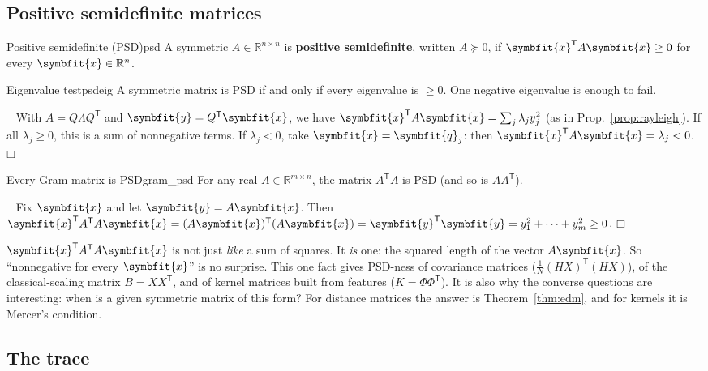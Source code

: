 \documentclass[11pt]{article}
\newcommand{\bm}[1]{\symbfit{#1}}
\newenvironment{proofsketch}{\par\noindent{\itshape Proof.}\ }{\hfill$\mdlgwhtsquare$\par}
\newcommand{\R}{\mathbb{R}}
\newcommand{\vx}{\bm{x}}
\newcommand{\vy}{\bm{y}}
\newcommand{\vq}{\bm{q}}
\newcommand{\T}{^{\mathsf T}}
\begin{document}
\subsection{Positive semidefinite matrices}

\begin{definition}{Positive semidefinite (PSD)}{psd}
A symmetric $A\in\R^{n\times n}$ is \textbf{positive semidefinite}, written $A\succeq0$, if
$\vx\T A\vx\ge0$ for every $\vx\in\R^n$.
\end{definition}

\begin{proposition}{Eigenvalue test}{psdeig}
A symmetric matrix is PSD if and only if every eigenvalue is $\ge0$. One negative eigenvalue is enough to fail.
\end{proposition}
\begin{proofsketch}
With $A=Q\Lambda Q\T$ and $\vy=Q\T\vx$, we have $\vx\T A\vx=\sum_j\lambda_jy_j^2$ (as in Prop.~\ref{prop:rayleigh}). If all
$\lambda_j\ge0$, this is a sum of nonnegative terms. If $\lambda_j<0$, take $\vx=\vq_j$: then $\vx\T A\vx=\lambda_j<0$.
\end{proofsketch}

\begin{proposition}{Every Gram matrix is PSD}{gram_psd}
For any real $A\in\R^{m\times n}$, the matrix $A\T A$ is PSD (and so is $AA\T$).
\end{proposition}
\begin{proofsketch}
Fix $\vx$ and let $\vy=A\vx$. Then $\vx\T A\T A\vx=(A\vx)\T(A\vx)=\vy\T\vy=y_1^2+\cdots+y_m^2\ge0$.
\end{proofsketch}

\begin{intuition}
$\vx\T A\T A\vx$ is not just \emph{like} a sum of squares. It \emph{is} one: the squared length of
the vector $A\vx$. So ``nonnegative for every $\vx$'' is no surprise. This one fact gives
PSD-ness of covariance matrices ($\tfrac1N(HX)\T(HX)$), of the classical-scaling matrix $B=XX\T$, and of
kernel matrices built from features ($K=\Phi\Phi\T$). It is also why the converse questions are
interesting: when is a given symmetric matrix of this form? For distance matrices the answer
is Theorem~\ref{thm:edm}, and for kernels it is Mercer's condition.
\end{intuition}

\subsection{The trace}
\end{document}
